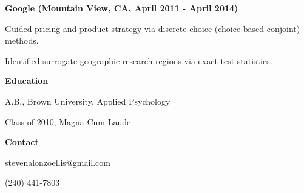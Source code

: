 \documentclass[12pt]{res}
\begin{document}
{\begin{resume}
\begin{minipage}{7.6in}
\begin{list}{}{\leftmargin=0em}
{\begin{list}{-}{\leftmargin=1em}
\item{\textbf{Google (Mountain View, CA, April  2011 - April  2014)}  
\begin{list}{--}{\leftmargin=1em}
\item Guided pricing and product strategy via discrete-choice (choice-based conjoint) methods.
\item Identified surrogate geographic research regions via exact-test statistics.
\end{list}}
\end{list}}



\item{\textbf{Education}\dotfill 
\begin{list}{-}{\leftmargin=1em}
\item A.B., Brown University, Applied Psychology
\item Class of 2010, Magna Cum Laude
\end{list}}

\item{\textbf{Contact\hspace{1mm}}\dotfill 
\begin{list}{-}{\leftmargin=1em}
\item stevenalonzoellis@gmail.com
\item (240) 441-7803
\end{list}}
\end{list}
\vspace{25mm}
\centering\fontsize{20pt}{30pt}\zapfinofont
{}

\end{minipage}
\end{resume}
} %
\end{document}
